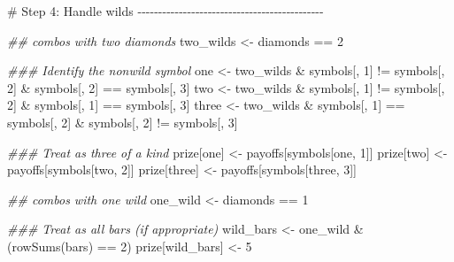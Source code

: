 \documentclass[
  letterpaper,
  DIV=11,
  numbers=noendperiod]{scrbook}
\newenvironment{Shaded}{\begin{snugshade}}{\end{snugshade}}
\newcommand{\CommentTok}[1]{\textcolor[rgb]{0.37,0.37,0.37}{#1}}
\newcommand{\DecValTok}[1]{\textcolor[rgb]{0.68,0.00,0.00}{#1}}
\newcommand{\DocumentationTok}[1]{\textcolor[rgb]{0.37,0.37,0.37}{\textit{#1}}}
\newcommand{\FunctionTok}[1]{\textcolor[rgb]{0.28,0.35,0.67}{#1}}
\newcommand{\NormalTok}[1]{\textcolor[rgb]{0.00,0.23,0.31}{#1}}
\newcommand{\OtherTok}[1]{\textcolor[rgb]{0.00,0.23,0.31}{#1}}
\newcommand{\SpecialCharTok}[1]{\textcolor[rgb]{0.37,0.37,0.37}{#1}}
\begin{document}
\begin{Shaded}
\begin{Highlighting}[]
  \CommentTok{\# Step 4: Handle wilds {-}{-}{-}{-}{-}{-}{-}{-}{-}{-}{-}{-}{-}{-}{-}{-}{-}{-}{-}{-}{-}{-}{-}{-}{-}{-}{-}{-}{-}{-}{-}{-}{-}{-}{-}{-}{-}{-}{-}{-}{-}{-}{-}{-}{-}}
  
  \DocumentationTok{\#\# combos with two diamonds}
\NormalTok{  two\_wilds }\OtherTok{\textless{}{-}}\NormalTok{ diamonds }\SpecialCharTok{==} \DecValTok{2}

  \DocumentationTok{\#\#\# Identify the nonwild symbol}
\NormalTok{  one }\OtherTok{\textless{}{-}}\NormalTok{ two\_wilds }\SpecialCharTok{\&}\NormalTok{ symbols[, }\DecValTok{1}\NormalTok{] }\SpecialCharTok{!=}\NormalTok{ symbols[, }\DecValTok{2}\NormalTok{] }\SpecialCharTok{\&} 
\NormalTok{    symbols[, }\DecValTok{2}\NormalTok{] }\SpecialCharTok{==}\NormalTok{ symbols[, }\DecValTok{3}\NormalTok{]}
\NormalTok{  two }\OtherTok{\textless{}{-}}\NormalTok{ two\_wilds }\SpecialCharTok{\&}\NormalTok{ symbols[, }\DecValTok{1}\NormalTok{] }\SpecialCharTok{!=}\NormalTok{ symbols[, }\DecValTok{2}\NormalTok{] }\SpecialCharTok{\&} 
\NormalTok{    symbols[, }\DecValTok{1}\NormalTok{] }\SpecialCharTok{==}\NormalTok{ symbols[, }\DecValTok{3}\NormalTok{]}
\NormalTok{  three }\OtherTok{\textless{}{-}}\NormalTok{ two\_wilds }\SpecialCharTok{\&}\NormalTok{ symbols[, }\DecValTok{1}\NormalTok{] }\SpecialCharTok{==}\NormalTok{ symbols[, }\DecValTok{2}\NormalTok{] }\SpecialCharTok{\&} 
\NormalTok{    symbols[, }\DecValTok{2}\NormalTok{] }\SpecialCharTok{!=}\NormalTok{ symbols[, }\DecValTok{3}\NormalTok{]}
  
  \DocumentationTok{\#\#\# Treat as three of a kind}
\NormalTok{  prize[one] }\OtherTok{\textless{}{-}}\NormalTok{ payoffs[symbols[one, }\DecValTok{1}\NormalTok{]]}
\NormalTok{  prize[two] }\OtherTok{\textless{}{-}}\NormalTok{ payoffs[symbols[two, }\DecValTok{2}\NormalTok{]]}
\NormalTok{  prize[three] }\OtherTok{\textless{}{-}}\NormalTok{ payoffs[symbols[three, }\DecValTok{3}\NormalTok{]]}
  
  \DocumentationTok{\#\# combos with one wild}
\NormalTok{  one\_wild }\OtherTok{\textless{}{-}}\NormalTok{ diamonds }\SpecialCharTok{==} \DecValTok{1}
  
  \DocumentationTok{\#\#\# Treat as all bars (if appropriate)}
\NormalTok{  wild\_bars }\OtherTok{\textless{}{-}}\NormalTok{ one\_wild }\SpecialCharTok{\&}\NormalTok{ (}\FunctionTok{rowSums}\NormalTok{(bars) }\SpecialCharTok{==} \DecValTok{2}\NormalTok{)}
\NormalTok{  prize[wild\_bars] }\OtherTok{\textless{}{-}} \DecValTok{5}
  

\end{Highlighting}
\end{Shaded}
\end{document}
